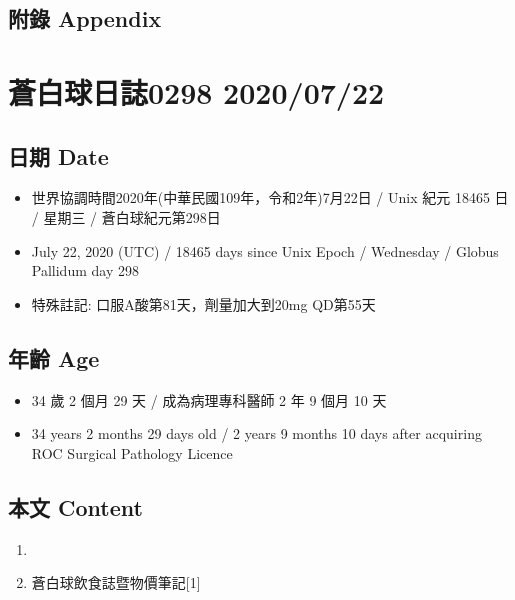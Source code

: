 \documentclass[
]{article}
\providecommand{\tightlist}{%
  \setlength{\itemsep}{0pt}\setlength{\parskip}{0pt}}
\begin{document}
\hypertarget{ux9644ux9304-appendix-20}{%
\subsection{附錄 Appendix}\label{ux9644ux9304-appendix-20}}

\hypertarget{ux84bcux767dux7403ux65e5ux8a8c0298-20200722}{%
\section{蒼白球日誌0298
2020/07/22}\label{ux84bcux767dux7403ux65e5ux8a8c0298-20200722}}

\hypertarget{ux65e5ux671f-date-21}{%
\subsection{日期 Date}\label{ux65e5ux671f-date-21}}

\begin{itemize}
\tightlist
\item
  世界協調時間2020年(中華民國109年，令和2年)7月22日 / Unix 紀元 18465 日
  / 星期三 / 蒼白球紀元第298日
\item
  July 22, 2020 (UTC) / 18465 days since Unix Epoch / Wednesday / Globus
  Pallidum day 298
\item
  特殊註記: 口服A酸第81天，劑量加大到20mg QD第55天
\end{itemize}

\hypertarget{ux5e74ux9f61-age-21}{%
\subsection{年齡 Age}\label{ux5e74ux9f61-age-21}}

\begin{itemize}
\tightlist
\item
  34 歲 2 個月 29 天 / 成為病理專科醫師 2 年 9 個月 10 天
\item
  34 years 2 months 29 days old / 2 years 9 months 10 days after
  acquiring ROC Surgical Pathology Licence
\end{itemize}

\hypertarget{ux672cux6587-content-21}{%
\subsection{本文 Content}\label{ux672cux6587-content-21}}

\begin{enumerate}
\def\labelenumi{\arabic{enumi}.}
\tightlist
\item
\item
  蒼白球飲食誌暨物價筆記{[}1{]}
\end{enumerate}
\end{document}
